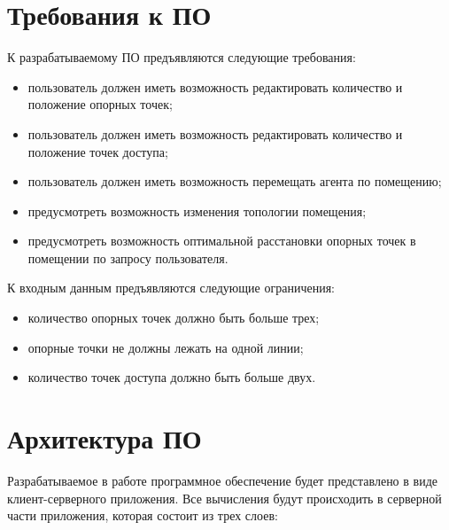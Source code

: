 \section{Требования к ПО}

К разрабатываемому ПО предъявляются следующие требования:

\begin{itemize}[label=---]
    \item пользователь должен иметь возможность редактировать количество и положение опорных точек;
    \item пользователь должен иметь возможность редактировать количество и положение точек доступа;
    \item пользователь должен иметь возможность перемещать агента по помещению;
    \item предусмотреть возможность изменения топологии помещения;
    \item предусмотреть возможность оптимальной расстановки опорных точек в помещении по запросу пользователя.
\end{itemize}

К входным данным предъявляются следующие ограничения:

\begin{itemize}[label=---]
    \item количество опорных точек должно быть больше трех;
    \item опорные точки не должны лежать на одной линии;
    \item количество точек доступа должно быть больше двух.
\end{itemize}

\clearpage

\section{Архитектура ПО}


Разрабатываемое в работе программное обеспечение будет представлено в виде клиент-серверного приложения. Все вычисления будут происходить в серверной части приложения, которая состоит из трех слоев:

